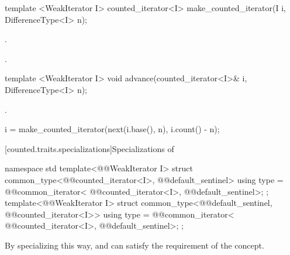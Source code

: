 \begin{addedblock}
%
\begin{itemdecl}
template <WeakIterator I>
  counted_iterator<I> make_counted_iterator(I i, DifferenceType<I> n);
\end{itemdecl}

\begin{itemdescr}
\pnum
\requires {}.

\pnum
\returns {}.
\end{itemdescr}

%
\begin{itemdecl}
template <WeakIterator I>
  void advance(counted_iterator<I>& i, DifferenceType<I> n);
\end{itemdecl}

\begin{itemdescr}
\pnum
\requires {}.

\pnum
\effects
\begin{codeblock}
i = make_counted_iterator(next(i.base(), n), i.count() - n);
\end{codeblock}
\end{itemdescr}

[counted.traits.specializations]{Specializations of }

%
\begin{itemdecl}
namespace std {
  template<@@WeakIterator I>
  struct common_type<@@counted_iterator<I>,
                     @@default_sentinel> {
    using type = @@common_iterator<
      @@counted_iterator<I>,
      @@default_sentinel>;
  };
  template<@@WeakIterator I>
  struct common_type<@@default_sentinel,
                     @@counted_iterator<I>> {
    using type = @@common_iterator<
      @@counted_iterator<I>,
      @@default_sentinel>;
  };
}
\end{itemdecl}

\begin{itemdescr}
\pnum
\enternote By specializing  this way, 
and  can satisfy the  requirement of the
 concept.\exitnote
\end{itemdescr}


\end{addedblock}

